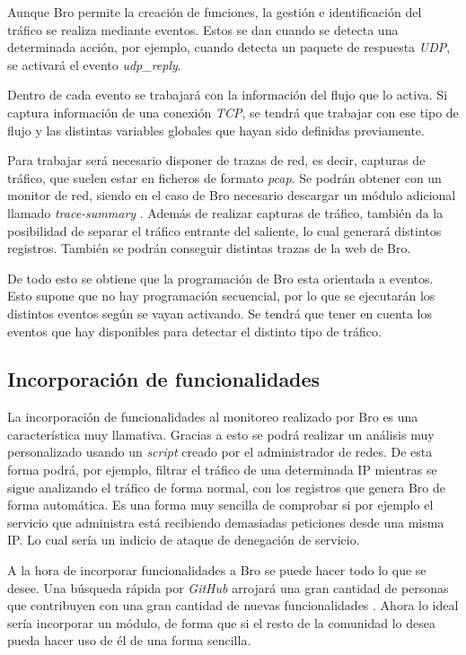 Aunque Bro permite la creación de funciones, la gestión e identificación del tráfico se realiza mediante eventos. Estos se dan cuando 
se detecta una determinada acción, por ejemplo, cuando detecta un paquete de respuesta \textit{UDP}, se activará el evento \textit{udp\_reply}.

\intro Dentro de cada evento se trabajará con la información del flujo que lo activa. Si captura información de una conexión 
\textit{TCP}, se tendrá que trabajar con ese tipo de flujo y las distintas variables globales que hayan sido definidas previamente.

\intro Para trabajar será necesario disponer de trazas de red, es decir, capturas de tráfico, que suelen estar en ficheros de formato 
\textit{pcap}. Se podrán obtener con un monitor de red, siendo en el caso de Bro necesario descargar un módulo adicional llamado 
\textit{trace-summary} \cite{brotrace}. Además de realizar capturas de tráfico, también da la posibilidad de separar el tráfico 
entrante del saliente, lo cual generará distintos registros. También se podrán conseguir distintas trazas de la web de Bro.

\intro De todo esto se obtiene que la programación de Bro esta orientada a eventos. Esto supone que no hay programación secuencial, 
por lo que se ejecutarán los distintos eventos según se vayan activando. Se tendrá que tener en cuenta los eventos que hay disponibles 
para detectar el distinto tipo de tráfico.

\subsection{Incorporación de funcionalidades}

La incorporación de funcionalidades al monitoreo realizado por Bro es una característica muy llamativa. Gracias 
a esto se podrá realizar un análisis muy personalizado usando un \textit{script} creado por el administrador de redes. De 
esta forma podrá, por ejemplo, filtrar el tráfico de una determinada IP mientras se sigue analizando el tráfico 
de forma normal, con los registros que genera Bro de forma automática. Es una forma muy sencilla de comprobar 
si por ejemplo el servicio que administra está recibiendo demasiadas peticiones desde una misma IP. Lo cual 
sería un indicio de ataque de denegación de servicio.

\intro A la hora de incorporar funcionalidades a Bro se puede hacer todo lo que se desee. Una búsqueda rápida 
por \textit{GitHub} arrojará una gran cantidad de personas que contribuyen con una gran cantidad de nuevas 
funcionalidades \citep{gitbeacon}. Ahora lo ideal sería incorporar un módulo, de forma que si el resto 
de la comunidad lo desea pueda hacer uso de él de una forma sencilla.

